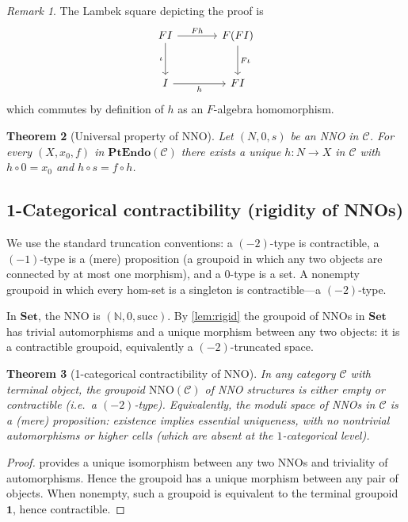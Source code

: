 \documentclass[12pt]{article}
\newtheorem{theorem}{Theorem}[section]
\theoremstyle{definition}
\theoremstyle{remark}
\newtheorem{remark}[theorem]{Remark}
\newcommand{\N}{\mathbb{N}}
\newcommand{\Set}{\mathbf{Set}}
\newcommand{\PtEndo}{\mathbf{PtEndo}}
\newcommand{\NNO}{\mathrm{NNO}}
\begin{document}
\begin{remark}
The Lambek square depicting the proof is
\[
\begin{tikzcd}[column sep=large, row sep=large]
FI \arrow[r, "Fh"] \arrow[d, "\iota"'] & F(FI) \arrow[d, "F\iota"] \\
I \arrow[r, "h"'] & FI
\end{tikzcd}
\]
which commutes by definition of $h$ as an $F$-algebra homomorphism.
\end{remark}

\begin{theorem}[Universal property of NNO]\label{thm:up}
Let $(N,0,s)$ be an NNO in $\mathcal{C}$. For every $(X,x_{0},f)$ in $\PtEndo(\mathcal{C})$ there exists a unique $h\colon N\to X$ in $\mathcal{C}$ with $h\circ 0 = x_{0}$ and $h\circ s = f\circ h$.
\end{theorem}

\subsection{1-Categorical contractibility (rigidity of NNOs)}\label{sec:rigidity-1cat}

We use the standard truncation conventions: a $(-2)$-type is contractible, a $(-1)$-type is a (mere) proposition (a groupoid in which any two objects are connected by at most one morphism), and a $0$-type is a set. A nonempty groupoid in which every hom-set is a singleton is contractible---a $(-2)$-type.

In $\Set$, the NNO is $(\N,0,\mathrm{succ})$. By \cref{lem:rigid} the groupoid of NNOs in $\Set$ has trivial automorphisms and a unique morphism between any two objects: it is a contractible groupoid, equivalently a $(-2)$-truncated space.

\begin{theorem}[1-categorical contractibility of $\NNO$]\label{thm:contr-1cat}
In any category $\mathcal{C}$ with terminal object, the groupoid $\NNO(\mathcal{C})$ of NNO structures is either empty or contractible (i.e.\ a $(-2)$-type). Equivalently, the moduli space of NNOs in $\mathcal{C}$ is a (mere) proposition: existence implies essential uniqueness, with no nontrivial automorphisms or higher cells (which are absent at the $1$-categorical level).
\end{theorem}

\begin{proof}
 provides a unique isomorphism between any two NNOs and triviality of automorphisms. Hence the groupoid has a unique morphism between any pair of objects. When nonempty, such a groupoid is equivalent to the terminal groupoid $\mathbf{1}$, hence contractible.
\end{proof}
\end{document}
